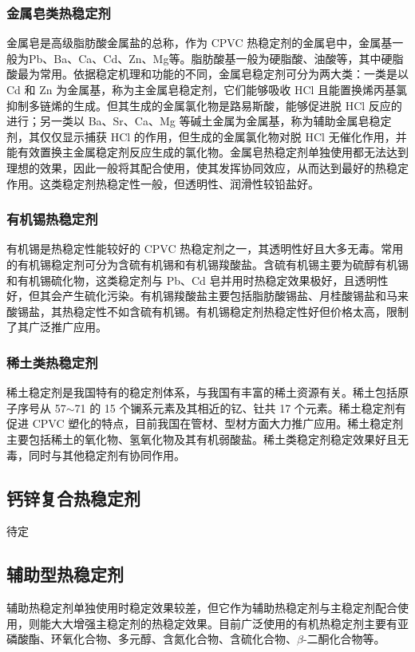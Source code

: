 \subsubsection{金属皂类热稳定剂}
金属皂是高级脂肪酸金属盐的总称，作为 CPVC 热稳定剂的金属皂中，金属基一般为Pb、Ba、Ca、Cd、Zn、Mg等。脂肪酸基一般为硬脂酸、油酸等，其中硬脂酸最为常用。依据稳定机理和功能的不同，金属皂稳定剂可分为两大类：一类是以 Cd 和 Zn 为金属基，称为主金属皂稳定剂，它们能够吸收 HCl 且能置换烯丙基氯抑制多链烯的生成。但其生成的金属氯化物是路易斯酸，能够促进脱 HCl 反应的进行；另一类以 Ba、Sr、Ca、Mg 等碱土金属为金属基，称为辅助金属皂稳定剂，其仅仅显示捕获 HCl 的作用，但生成的金属氯化物对脱 HCl 无催化作用，并能有效置换主金属稳定剂反应生成的氯化物。金属皂热稳定剂单独使用都无法达到理想的效果，因此一般将其配合使用，使其发挥协同效应，从而达到最好的热稳定作用。这类稳定剂热稳定性一般，但透明性、润滑性较铅盐好。

\subsubsection{有机锡热稳定剂}
有机锡是热稳定性能较好的 CPVC 热稳定剂之一，其透明性好且大多无毒。常用的有机锡稳定剂可分为含硫有机锡和有机锡羧酸盐。含硫有机锡主要为硫醇有机锡和有机锡硫化物，这类稳定剂与 Pb、Cd 皂并用时热稳定效果极好，且透明性好，但其会产生硫化污染。有机锡羧酸盐主要包括脂肪酸锡盐、月桂酸锡盐和马来酸锡盐，其热稳定性不如含硫有机锡。有机锡稳定剂热稳定性好但价格太高，限制了其广泛推广应用。

\subsubsection{稀土类热稳定剂}
稀土稳定剂是我国特有的稳定剂体系，与我国有丰富的稀土资源有关。稀土包括原子序号从 57$\sim$71 的 15 个镧系元素及其相近的钇、钍共 17 个元素。稀土稳定剂有促进 CPVC 塑化的特点，目前我国在管材、型材方面大力推广应用。稀土稳定剂主要包括稀土的氧化物、氢氧化物及其有机弱酸盐。稀土类稳定剂稳定效果好且无毒，同时与其他稳定剂有协同作用。

\subsection{钙锌复合热稳定剂}
待定

\subsection{辅助型热稳定剂}
辅助热稳定剂单独使用时稳定效果较差，但它作为辅助热稳定剂与主稳定剂配合使用，则能大大增强主稳定剂的热稳定效果。目前广泛使用的有机热稳定剂主要有亚磷酸酯、环氧化合物、多元醇、含氮化合物、含硫化合物、$\beta$-二酮化合物等\cite{26}。


